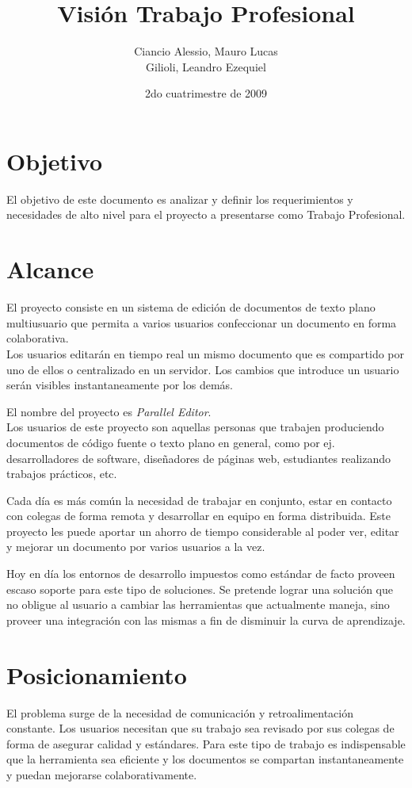 \documentclass[a4paper,11pt]{article}
\title { Visi\'on Trabajo Profesional }
\date{2do cuatrimestre de 2009}
\author{Ciancio Alessio, Mauro Lucas \\ Gilioli, Leandro Ezequiel }
\begin{document}
	\maketitle

	\section{Objetivo}
		El objetivo de este documento es analizar y definir los requerimientos y
		necesidades de alto nivel para el proyecto a presentarse como Trabajo Profesional.

	\section{Alcance}
	    El proyecto consiste en un sistema de edici\'on de documentos de texto plano
	    multiusuario que permita a varios usuarios confeccionar un documento en forma
	    colaborativa. \\
	    Los usuarios editar\'an en tiempo real un mismo documento que es compartido por uno
	    de ellos o centralizado en un servidor. Los cambios que introduce un usuario 
	    ser\'an visibles instantaneamente por los dem\'as.	
	    
		El nombre del proyecto es \textit{Parallel Editor}. \\

		Los usuarios de este proyecto son aquellas personas que trabajen produciendo 
		documentos de c\'odigo fuente o texto plano en general, como por ej. desarrolladores
		de software, dise\~nadores de p\'aginas web, estudiantes realizando trabajos prácticos,
		etc.

		Cada d\'ia es m\'as com\'un la necesidad de trabajar en conjunto, estar en contacto
		con colegas de forma remota y desarrollar en equipo en forma distribuida. Este proyecto
		les puede aportar un ahorro de tiempo considerable al poder ver, editar y mejorar un
		documento por varios usuarios a la vez.

	    Hoy en d\'ia los entornos de desarrollo impuestos como est\'andar de facto proveen escaso
	    soporte para este tipo de soluciones. Se pretende lograr una soluci\'on que no obligue al
	    usuario a cambiar las herramientas que actualmente maneja, sino proveer una integraci\'on
	    con las mismas a fin de disminuir la curva de aprendizaje.

	\section{Posicionamiento}
		El problema surge de la necesidad de comunicaci\'on y retroalimentaci\'on constante.
		Los usuarios necesitan que su trabajo sea revisado por sus colegas de forma de asegurar
		calidad y est\'andares. Para este tipo de trabajo es indispensable que la herramienta sea
		eficiente y los documentos se compartan instantaneamente y puedan mejorarse colaborativamente.
\end{document}
